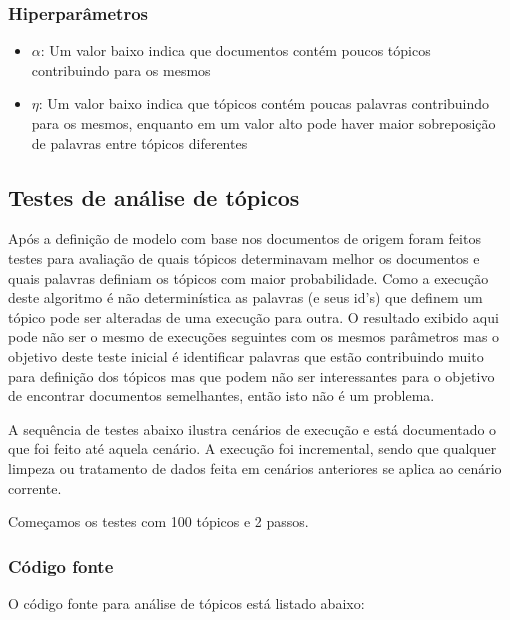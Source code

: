 \subsubsection{Hiperparâmetros}

\begin{itemize}
    \item $\alpha$: Um valor baixo indica que documentos contém poucos tópicos contribuindo para os mesmos
    \item $\eta$: Um valor baixo indica que tópicos contém poucas palavras contribuindo para os mesmos, enquanto em um valor alto pode haver maior sobreposição 
    de palavras entre tópicos diferentes
\end{itemize}

\subsection{Testes de análise de tópicos}

Após a definição de modelo com base nos documentos de origem foram feitos testes para avaliação de quais tópicos determinavam melhor os documentos e quais 
palavras definiam os tópicos com maior probabilidade. Como a execução deste algoritmo é não determinística as palavras (e seus id's) que definem 
um tópico pode ser alteradas de uma execução para outra. O resultado exibido aqui pode não ser o mesmo de execuções seguintes com os mesmos parâmetros mas 
o objetivo deste teste inicial é identificar palavras que estão contribuindo muito para definição dos tópicos mas que podem não ser interessantes 
para o objetivo de encontrar documentos semelhantes, então isto não é um problema.

A sequência de testes abaixo ilustra cenários de execução e está documentado o que foi feito até aquela cenário. A execução foi incremental, sendo que 
qualquer limpeza ou tratamento de dados feita em cenários anteriores se aplica ao cenário corrente.

Começamos os testes com 100 tópicos e 2 passos.

\subsubsection{Código fonte}

O código fonte para análise de tópicos está listado abaixo:



